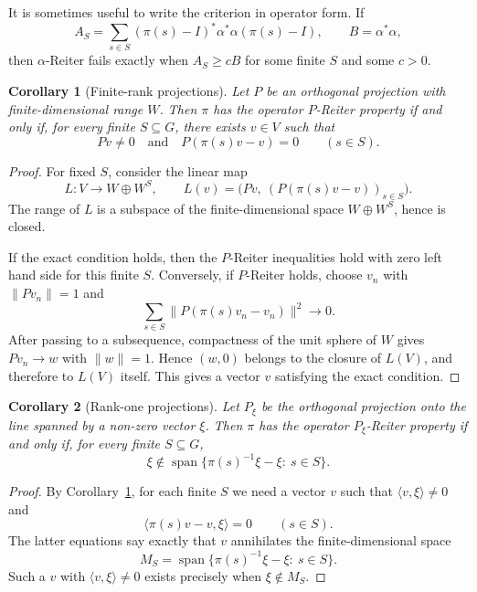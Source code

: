 \documentclass[11pt]{article}
\newtheorem{corollary}{Corollary}
\newcommand{\spanop}{\operatorname{span}}
\begin{document}
It is sometimes useful to write the criterion in operator form.  If
\[
  A_S=\sum_{s\in S}(\pi(s)-I)^*\alpha^*\alpha(\pi(s)-I),
  \qquad B=\alpha^*\alpha,
\]
then $\alpha$-Reiter fails exactly when $A_S\geq cB$ for some finite $S$ and
some $c>0$.

\begin{corollary}[Finite-rank projections]
\label{cor:finite-rank}
Let $P$ be an orthogonal projection with finite-dimensional range $W$.  Then
$\pi$ has the operator $P$-Reiter property if and only if, for every finite
$S\subseteq G$, there exists $v\in V$ such that
\[
  Pv\neq 0
  \quad\text{and}\quad
  P(\pi(s)v-v)=0\qquad(s\in S).
\]
\end{corollary}

\begin{proof}
For fixed $S$, consider the linear map
\[
  L:V\longrightarrow W\oplus W^S,\qquad
  L(v)=\big(Pv,\ (P(\pi(s)v-v))_{s\in S}\big).
\]
The range of $L$ is a subspace of the finite-dimensional space
$W\oplus W^S$, hence is closed.

If the exact condition holds, then the $P$-Reiter inequalities hold with
zero left hand side for this finite $S$.  Conversely, if $P$-Reiter holds,
choose $v_n$ with $\|Pv_n\|=1$ and
\[
  \sum_{s\in S}\|P(\pi(s)v_n-v_n)\|^2\longrightarrow 0.
\]
After passing to a subsequence, compactness of the unit sphere of $W$ gives
$Pv_n\to w$ with $\|w\|=1$.  Hence $(w,0)$ belongs to the closure of
$L(V)$, and therefore to $L(V)$ itself.  This gives a vector $v$ satisfying
the exact condition.
\end{proof}

\begin{corollary}[Rank-one projections]
Let $P_\xi$ be the orthogonal projection onto the line spanned by a non-zero
vector $\xi$.  Then $\pi$ has the operator $P_\xi$-Reiter property if and only
if, for every finite $S\subseteq G$,
\[
  \xi\notin
  \spanop\{\pi(s)^{-1}\xi-\xi:\ s\in S\}.
\]
\end{corollary}

\begin{proof}
By Corollary~\ref{cor:finite-rank}, for each finite $S$ we need a vector
$v$ such that $\langle v,\xi\rangle\neq 0$ and
\[
  \langle \pi(s)v-v,\xi\rangle=0\qquad(s\in S).
\]
The latter equations say exactly that $v$ annihilates the finite-dimensional
space
\[
  M_S=\spanop\{\pi(s)^{-1}\xi-\xi:\ s\in S\}.
\]
Such a $v$ with $\langle v,\xi\rangle\neq0$ exists precisely when
$\xi\notin M_S$.
\end{proof}
\end{document}
